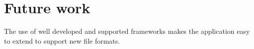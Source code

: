 \chapter{Future work}
The use of well developed and supported frameworks makes the application easy to extend to support new file formats.